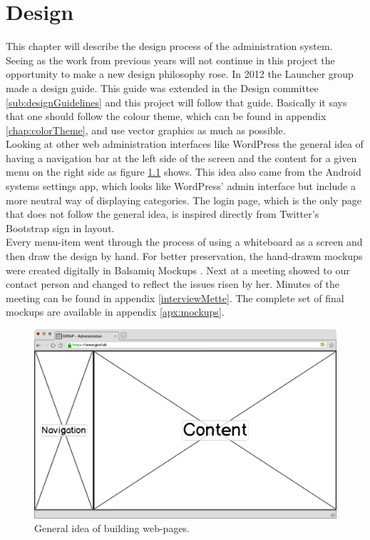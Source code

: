 \chapter{Design}
\label{chp:design}
This chapter will describe the design process of the administration system.\\
Seeing as the work from previous years will not continue in this project the opportunity to make a new design philosophy rose. 
In 2012 the Launcher group made a design guide. This guide was extended in the Design committee \ref{sub:designGuidelines} and this project will follow that guide. Basically it says that one should follow the colour theme, which can be found in appendix \ref{chap:colorTheme}, and use vector graphics as much as possible. \\
Looking at other web administration interfaces like WordPress \citep{wordpress} the general idea of having a navigation bar at the left side of the screen and the content for a given menu on the right side as figure \ref{fig:ideaWep} shows. This idea also came from the Android systems settings app, which looks like WordPress' admin interface but include a more neutral way of displaying categories. The login page, which is the only page that does not follow the general idea, is inspired directly from Twitter's Bootstrap \citep{bootstrap} sign in layout.\\ 
Every menu-item went through the process of using a whiteboard as a screen and then draw the design by hand. For better preservation, the hand-drawm mockups were created digitally in Balsamiq Mockups \citep{balsamiq}. Next at a meeting showed to our contact person and changed to reflect the issues risen by her. Minutes of the meeting can be found in appendix \ref{interviewMette}. The complete set of final mockups are available in appendix \ref{apx:mockups}.\\

\begin{figure}[!h]
\centering
\includegraphics[width=1\textwidth]{images/mockup/displayMode.png}
\caption{General idea of building web-pages.}
\label{fig:ideaWep}
\end{figure}


